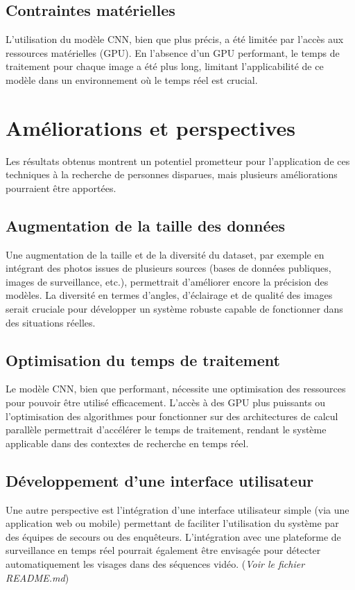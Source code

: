 \documentclass[a4paper,12pt]{report}
\begin{document}
\subsection{Contraintes matérielles}
L’utilisation du modèle CNN, bien que plus précis, a été limitée par l’accès aux ressources matérielles (GPU). En l’absence d’un GPU performant, le temps de traitement pour chaque image a été plus long, limitant l’applicabilité de ce modèle dans un environnement où le temps réel est crucial.

\section{Améliorations et perspectives}
Les résultats obtenus montrent un potentiel prometteur pour l’application de ces techniques à la recherche de personnes disparues, mais plusieurs améliorations pourraient être apportées.

\subsection{Augmentation de la taille des données}
Une augmentation de la taille et de la diversité du dataset, par exemple en intégrant des photos issues de plusieurs sources (bases de données publiques, images de surveillance, etc.), permettrait d’améliorer encore la précision des modèles. La diversité en termes d'angles, d'éclairage et de qualité des images serait cruciale pour développer un système robuste capable de fonctionner dans des situations réelles.

\subsection{Optimisation du temps de traitement}
Le modèle CNN, bien que performant, nécessite une optimisation des ressources pour pouvoir être utilisé efficacement. L’accès à des GPU plus puissants ou l’optimisation des algorithmes pour fonctionner sur des architectures de calcul parallèle permettrait d’accélérer le temps de traitement, rendant le système applicable dans des contextes de recherche en temps réel.

\subsection{Développement d'une interface utilisateur}
Une autre perspective est l'intégration d’une interface utilisateur simple (via une application web ou mobile) permettant de faciliter l’utilisation du système par des équipes de secours ou des enquêteurs. L’intégration avec une plateforme de surveillance en temps réel pourrait également être envisagée pour détecter automatiquement les visages dans des séquences vidéo. (\textit{Voir le fichier README.md})
\end{document}
